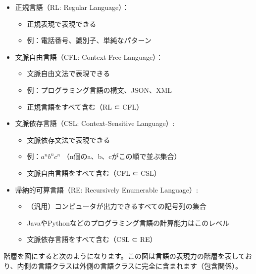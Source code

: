 \begin{itemize}
\item
  正規言語（RL: Regular Language）：

  \begin{itemize}
  \item
    正規表現で表現できる
  \item
    例：電話番号、識別子、単純なパターン
  \end{itemize}
\item
  文脈自由言語（CFL: Context-Free Language）：

  \begin{itemize}
  \item
    文脈自由文法で表現できる
  \item
    例：プログラミング言語の構文、JSON、XML
  \item
    正規言語をすべて含む（RL ⊂ CFL）
  \end{itemize}
\item
  文脈依存言語（CSL: Context-Sensitive Language）:

  \begin{itemize}
  \item
    文脈依存文法で表現できる
  \item
    例：$a^nb^nc^n$ （n個のa、b、cがこの順で並ぶ集合）
  \item
    文脈自由言語をすべて含む（CFL ⊂ CSL）
  \end{itemize}
\item
  帰納的可算言語（RE: Recursively Enumerable Language）:

  \begin{itemize}
  \item
    （汎用）コンピュータが出力できるすべての記号列の集合
  \item
    JavaやPythonなどのプログラミング言語の計算能力はこのレベル
  \item
    文脈依存言語をすべて含む（CSL ⊂ RE）
  \end{itemize}
\end{itemize}

階層を図にすると次のようになります。この図は言語の表現力の階層を表しており、内側の言語クラスは外側の言語クラスに完全に含まれます（包含関係）。

